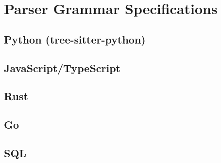 ﻿%
\chapter{Parser Grammar Specifications}
\label{app:grammars}

\section{Python (tree-sitter-python)}


\section{JavaScript/TypeScript}


\section{Rust}


\section{Go}


\section{SQL}



